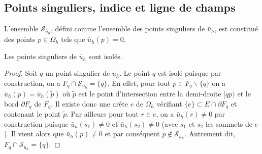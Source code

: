 \subsection*{Points singuliers, indice et ligne de champs}

L'ensemble $\mathcal{S}_{\bar{u}_h}$, défini comme l'ensemble des points singuliers de $\bar{u}_h$, est constitué des points $p \in \Omega_h$ tels que $\bar{u}_h(p) = 0$.
\begin{lemma}
    Les points singuliers de $\bar{u}_h$ sont isolés.
\end{lemma}
\begin{proof}
    Soit $q$ un point singulier de $\bar{u}_h$. Le point $q$ est isolé puisque par construction, on a $F_q\cap\mathcal{S}_{\bar{u}_h}=\{q\}$. En effet, pour tout $p\in F_q\backslash\{q\}$ on a $\bar{u}_h(p)=\bar{u}_h(\widetilde{p})$ où $\widetilde{p}$ est le point d'intersection entre la demi-droite $[qp)$ et le bord $\partial F_q$ de $F_q$. Il existe donc une arête $e$ de $\Omega_h$ vérifiant $\{e\}\subset E\cap\partial F_q$ et contenant le point $\widetilde{p}$. Par ailleurs pour tout $r\in e$, on a $\bar{u}_h(r)\neq 0$ par construction puisque $\bar{u}_h(s_1)\neq 0$ et $\bar{u}_h(s_2)\neq 0$ (avec $s_1$ et $s_2$ les sommets de $e$). Il vient alors que $\bar{u}_h(\widetilde{p})\neq 0$ et par conséquent $p\notin \mathcal{S}_{\bar{u}_h}$. Autrement dit, $F_q\cap\mathcal{S}_{\bar{u}_h}=\{q\}$.
\end{proof}

